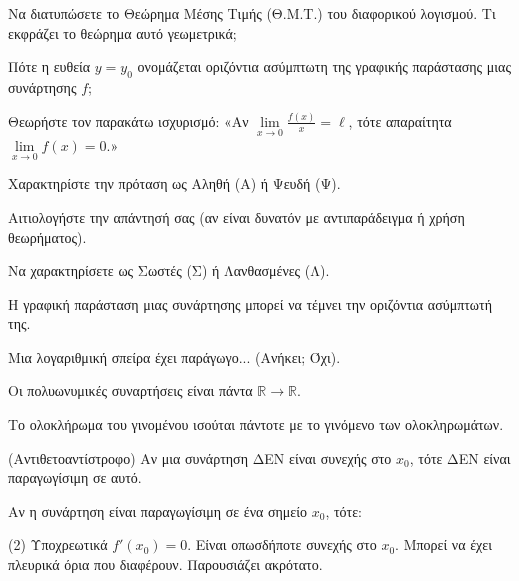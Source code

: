 \documentclass[11pt,a4paper]{article}
\newcommand{\kerkissans}[1]{{\fontfamily{maksf}\selectfont \textbf{#1}}}
\renewcommand{\textdexiakeraia}{}
\newcommand\themanum{A}
\newcounter{thema}[section]
\renewcommand{\thethema}{\arabic{thema}}
\newcommand{\Thema}{\refstepcounter{thema}{\textbf{\textcolor{black}{\faPenSquare\ \  \large \kerkissans{\textbf{\thethemaο\hspace{2mm}Διαγώνισμα - Θέμα \themanum}}}}}\hspace{0mm}}{}
\newenvironment{thema}[1]
{\begin{tcolorbox}[title=\Thema\kerkissans{\textbf{\large{  #1}}},breakable,
enhanced standard,titlerule=0pt,toprule=0pt, rightrule=0pt, bottomrule=0pt,
colback=white,left=0mm,top=1mm,bottom=0mm,
boxrule=0pt,
colframe=white,leftrule=0mm,sharp corners,coltitle=black]
\renewcommand{\themanum}{#1}}
{\end{tcolorbox}}
\begin{document}
\begin{thema}{A}
\begin{erwthma}
    \item Να διατυπώσετε το Θεώρημα Μέσης Τιμής (Θ.Μ.Τ.) του διαφορικού λογισμού. Τι εκφράζει το θεώρημα αυτό γεωμετρικά;
    \item Πότε η ευθεία $y=y_0$ ονομάζεται οριζόντια ασύμπτωτη της γραφικής παράστασης μιας συνάρτησης $f$;
    \item Θεωρήστε τον παρακάτω ισχυρισμό:
    «Αν $\lim\limits_{x\to 0} \frac{f(x)}{x} = \ell$, τότε απαραίτητα $\lim\limits_{x\to 0} f(x) = 0$.»
    \begin{alist}
    \item Χαρακτηρίστε την πρόταση ως Αληθή (Α) ή Ψευδή (Ψ).
    \item Αιτιολογήστε την απάντησή σας (αν είναι δυνατόν με αντιπαράδειγμα ή χρήση θεωρήματος).
    \end{alist}
    \item Να χαρακτηρίσετε ως Σωστές (Σ) ή Λανθασμένες (Λ).
    \begin{alist}
        \item Η γραφική παράσταση μιας συνάρτησης μπορεί να τέμνει την οριζόντια ασύμπτωτή της.
        \item Μια λογαριθμική σπείρα έχει παράγωγο... (Ανήκει; Όχι).
        \item Οι πολυωνυμικές συναρτήσεις είναι πάντα $\mathbb{R} \to \mathbb{R}$.
        \item Το ολοκλήρωμα του γινομένου ισούται πάντοτε με το γινόμενο των ολοκληρωμάτων.
        \item (Αντιθετοαντίστροφο) Αν μια συνάρτηση ΔΕΝ είναι συνεχής στο $x_0$, τότε ΔΕΝ είναι παραγωγίσιμη σε αυτό.
    \end{alist}
    \item Αν η συνάρτηση είναι παραγωγίσιμη σε ένα σημείο $x_0$, τότε:
    \begin{tasks}[label=\let\textdexiakeraia\relax\alph*.](2)
        \task Υποχρεωτικά $f'(x_0) = 0$.
        \task Είναι οπωσδήποτε συνεχής στο $x_0$.
        \task Μπορεί να έχει πλευρικά όρια που διαφέρουν.
        \task Παρουσιάζει ακρότατο.
    \end{tasks}
\end{erwthma}
\end{thema}
\vspace{1cm}
\end{document}
